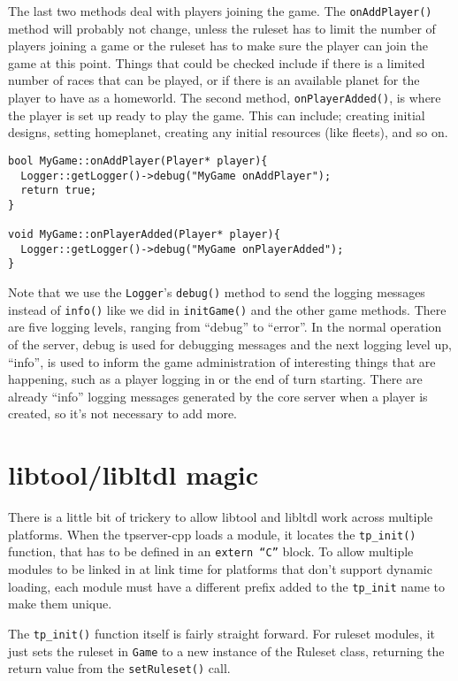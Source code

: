 \documentclass[a4paper,11pt]{report}
\newcommand{\codename}[1]{\texttt{#1}}
\begin{document}
The last two methods deal with players joining the game. The \codename{onAddPlayer()} method will probably not change, unless the ruleset has to limit the number of players joining a game or the ruleset has to make sure the player can join the game at this point. Things that could be checked include if there is a limited number of races that can be played, or if there is an available planet for the player to have as a homeworld. The second method, \codename{onPlayerAdded()}, is where the player is set up ready to play the game. This can include; creating initial designs, setting homeplanet, creating any initial resources (like fleets), and so on.

\begin{verbatim}
bool MyGame::onAddPlayer(Player* player){
  Logger::getLogger()->debug("MyGame onAddPlayer");
  return true;
}

void MyGame::onPlayerAdded(Player* player){
  Logger::getLogger()->debug("MyGame onPlayerAdded");
}
\end{verbatim}

Note that we use the \codename{Logger}'s \codename{debug()} method to send the logging messages instead of \codename{info()} like we did in \codename{initGame()} and the other game methods. There are five logging levels, ranging from ``debug'' to ``error''. In the normal operation of the server, debug is used for debugging messages and the next logging level up, ``info'', is used to inform the game administration of interesting things that are happening, such as a player logging in or the end of turn starting. There are already ``info'' logging messages generated by the core server when a player is created, so it's not necessary to add more.


\section{libtool/libltdl magic}
There is a little bit of trickery to allow libtool and libltdl work across multiple platforms. When the tpserver-cpp loads a module, it locates the \codename{tp\_init()} function, that has to be defined in an \codename{extern ``C''} block. To allow multiple modules to be linked in at link time for platforms that don't support dynamic loading, each module must have a different prefix added to the \codename{tp\_init} name to make them unique.

The \codename{tp\_init()} function itself is fairly straight forward. For ruleset modules, it just sets the ruleset in \codename{Game} to a new instance of the Ruleset class, returning the return value from the \codename{setRuleset()} call.
\end{document}
